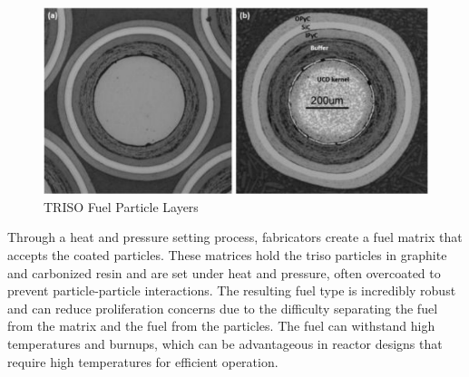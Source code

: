 \begin{figure}[!ht]
    \centering
    \includegraphics[scale=0.98]{images/triso_review/triso_layers.pdf}
    \caption{TRISO Fuel Particle Layers \cite{particle_review_2019}}
    \label{fig:triso_layers}
\end{figure}

Through a heat and pressure setting process, fabricators create a fuel matrix
that accepts the coated particles. These matrices hold the \gls{triso}
particles in graphite and carbonized resin and are set under heat and pressure,
often overcoated to prevent particle-particle interactions. The resulting fuel
type is incredibly robust and can reduce proliferation concerns due to the
difficulty separating the fuel from the matrix and the fuel from the particles.
The fuel can withstand high temperatures and burnups, which can be advantageous
in reactor designs that require high temperatures for efficient operation.